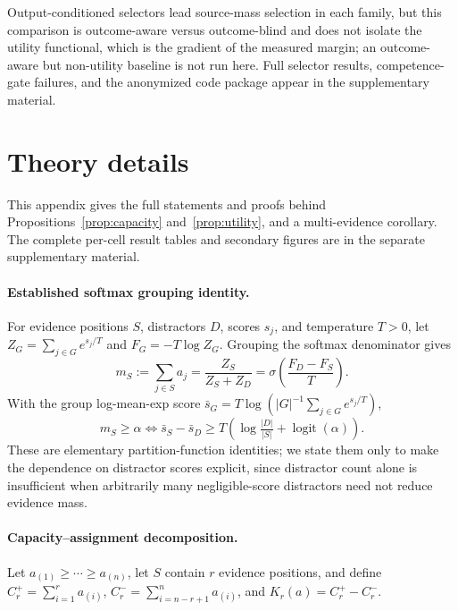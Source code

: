 \documentclass{article}
\begin{document}
Output-conditioned selectors lead source-mass selection in each family, but this comparison is
outcome-aware versus outcome-blind and does not isolate the utility functional, which is the gradient of the
measured margin; an outcome-aware but non-utility baseline is not run here. Full selector results,
competence-gate failures, and the anonymized code package appear in the supplementary material.

\section{Theory details}
\label{app:theory}

This appendix gives the full statements and proofs behind Propositions~\ref{prop:capacity}
and~\ref{prop:utility}, and a multi-evidence corollary. The complete per-cell result tables and secondary
figures are in the separate supplementary material.

\paragraph{Established softmax grouping identity.}
For evidence positions $S$, distractors $D$, scores $s_j$, and temperature $T>0$, let
$Z_G=\sum_{j\in G}e^{s_j/T}$ and $F_G=-T\log Z_G$. Grouping the softmax denominator gives
\begin{equation}
m_S:=\sum_{j\in S}a_j=\frac{Z_S}{Z_S+Z_D}=\sigma\!\left(\frac{F_D-F_S}{T}\right).
\label{eq:app-free-energy}
\end{equation}
With the group log-mean-exp score $\bar s_G=T\log(|G|^{-1}\sum_{j\in G}e^{s_j/T})$,
\begin{equation}
m_S\ge\alpha \Longleftrightarrow \bar s_S-\bar s_D\ge T\left(\log\tfrac{|D|}{|S|}+\operatorname{logit}(\alpha)\right).
\label{eq:app-length-cost}
\end{equation}
These are elementary partition-function identities; we state them only to make the dependence on distractor
scores explicit, since distractor count alone is insufficient when arbitrarily many negligible-score
distractors need not reduce evidence mass.

\paragraph{Capacity--assignment decomposition.}
Let $a_{(1)}\ge\cdots\ge a_{(n)}$, let $S$ contain $r$ evidence positions, and define
$C_r^+=\sum_{i=1}^r a_{(i)}$, $C_r^-=\sum_{i=n-r+1}^n a_{(i)}$, and $K_r(a)=C_r^+-C_r^-$.
\end{document}
